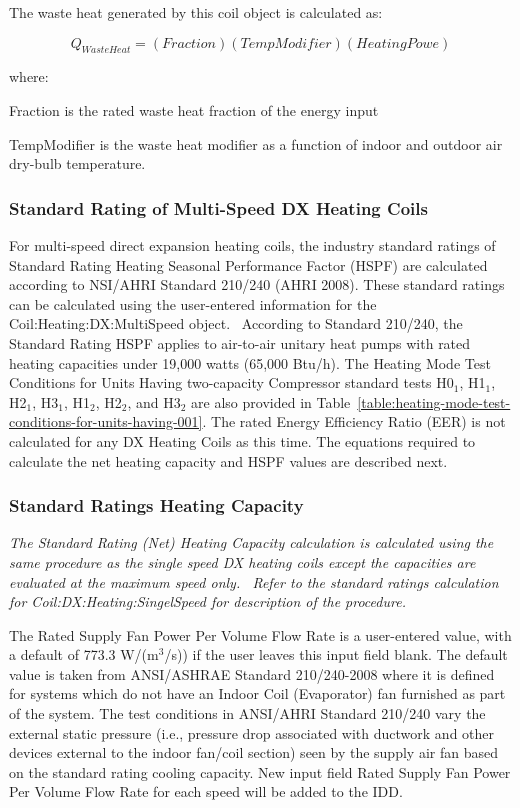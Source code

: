 The waste heat generated by this coil object is calculated as:

\begin{equation}
{Q_{WasteHeat}} = (Fraction)(TempModifier)(HeatingPowe)
\end{equation}

where:

Fraction is the rated waste heat fraction of the energy input

TempModifier is the waste heat modifier as a function of indoor and outdoor air dry-bulb temperature.

\subsubsection{Standard Rating of Multi-Speed DX Heating Coils}\label{standard-rating-of-multi-speed-dx-heating-coils}

For multi-speed direct expansion heating coils, the industry standard ratings of Standard Rating Heating Seasonal Performance Factor (HSPF) are calculated according to NSI/AHRI Standard 210/240 (AHRI 2008). These standard ratings can be calculated using the user-entered information for the Coil:Heating:DX:MultiSpeed object.~ According to Standard 210/240, the Standard Rating HSPF applies to air-to-air unitary heat pumps with rated heating capacities under 19,000 watts (65,000 Btu/h). The Heating Mode Test Conditions for Units Having two-capacity Compressor standard tests H0\(_{1}\), H1\(_{1}\), H2\(_{1}\), H3\(_{1}\), H1\(_{2}\), H2\(_{2}\), and H3\(_{2}\) are also provided in Table~\ref{table:heating-mode-test-conditions-for-units-having-001}. The rated Energy Efficiency Ratio (EER) is not calculated for any DX Heating Coils as this time. The equations required to calculate the net heating capacity and HSPF values are described next.

\subsubsection{Standard Ratings Heating Capacity}\label{standard-ratings-heating-capacity}

\emph{The Standard Rating (Net) Heating Capacity calculation is calculated using the same procedure as the single speed DX heating coils except the capacities are evaluated at the maximum speed only.~ Refer to the standard ratings calculation for Coil:DX:Heating:SingelSpeed for description of the procedure.}

The Rated Supply Fan Power Per Volume Flow Rate is a user-entered value, with a default of 773.3 W/(m\(^{3}\)/s)) if the user leaves this input field blank. The default value is taken from ANSI/ASHRAE Standard 210/240-2008 where it is defined for systems which do not have an Indoor Coil (Evaporator) fan furnished as part of the system. The test conditions in ANSI/AHRI Standard 210/240 vary the external static pressure (i.e., pressure drop associated with ductwork and other devices external to the indoor fan/coil section) seen by the supply air fan based on the standard rating cooling capacity. New input field Rated Supply Fan Power Per Volume Flow Rate for each speed will be added to the IDD.

